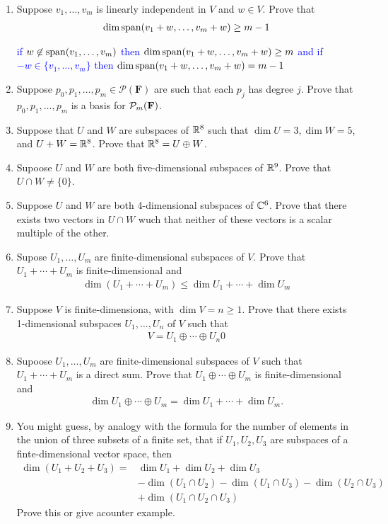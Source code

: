\documentclass[10pt,a4paper]{report}
\newcommand{\BLUE}[1]{\textcolor{blue}{#1}}
\newcommand{\F}{\textbf{F}}
\begin{document}
\begin{enumerate}
\item Suppose $v_1,\dots,v_m$ is linearly independent in $V$ and $w \in V$.  Prove that 
\begin{align*}
	\dim \operatorname{span}(v_1+w,\dots,v_m+w)\ge m-1
\end{align*}

\BLUE{if $w \not \in \operatorname{span}(v_1,\dots,v_m)$ then $	\dim \operatorname{span}(v_1+w,\dots,v_m+w) \ge m$ and if $-w \in \{v_1,\dots,v_m\}$ then $	\dim \operatorname{span}(v_1+w,\dots,v_m+w) = m-1$
}

\item Suppose $p_0,p_1,\dots,p_m\in \mathcal{P}(\F)$ are such that each $p_j$ has  degree $j$.  Prove that $p_0,p_1,\dots,p_m$ is a basis for $\PP{m}$.

\item Suppose that $U$ and $W$ are subspaces of $\mathbb{R}^8$ such that $\dim U=3, \dim W=5$, and $U+W = \mathbb{R}^8$.  Prove that $\mathbb{R}^8=U\oplus W$.

\item Supoose $U$ and $W$ are both five-dimensional subspaces of $\mathbb{R}^9$.  Prove that $U\cap W \ne \{0\}$.

\item Suppose $U$ and $W$ are both 4-dimensional subspaces of $\mathbb{C}^6$.  Prove that there exists two vectors in $U\cap W$ wuch that neither of these vectors is a scalar multiple of the other.

\item Supose $U_1,\dots, U_m$ are finite-dimensional subspaces of $V$.  Prove that $U_1+\cdots+U_m$ is finite-dimensional and 
\begin{align*}
	\dim(U_1+\cdots+U_m) \le \dim U_1+\cdots+\dim U_m
\end{align*}

\item Suppose $V$ is finite-dimensiona, with $\dim V = n \ge 1$.  Prove that there exists 1-dimensional subspaces $U_1,\dots, U_n$ of $V$ such that 
	\begin{align*}
		V = U_1\oplus\cdots\oplus U_n
0	\end{align*}
	
\item Supoose $U_1,\dots,U_m$ are finite-dimensional subspaces of $V$ such that $U_1+\cdots+U_m$ is a direct sum.  Prove that $U_1\oplus\cdots\oplus U_m$ is finite-dimensional and 
\begin{align*}
	\dim U_1\oplus \cdots \oplus U_m = \dim U_1 + \cdots + \dim U_m.
\end{align*}

\item You might guess, by analogy with the formula for the number of elements in the union of three subsets of a finite set, that if $U_1, U_2, U_3$ are subspaces of a finte-dimensional vector space, then 
\begin{align*}
	\dim(U_1+U_2+U_3) =& \dim U_1+\dim U_2+\dim U_3 \\
	&-\dim(U_1\cap U_2)-\dim(U_1\cap U_3)-\dim(U_2\cap U_3) \\
	&+\dim(U_1\cap U_2 \cap U_3)
\end{align*}  Prove this or give acounter example.

\end{enumerate}
\end{document}
